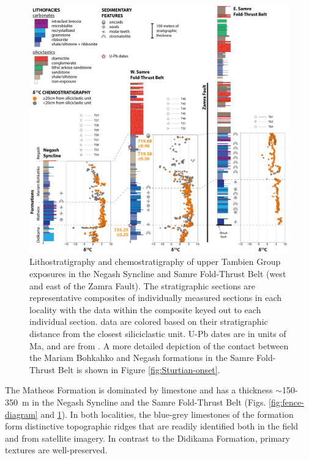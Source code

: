 \begin{figure}[h!]
\begin{center}
	\includegraphics[width=\textwidth]{figures/Tambien/upper-Tambien-comparison.pdf}
	\caption[Lithostratigraphy and \dC chemostratigraphy of the upper Tambien Group.]{Lithostratigraphy and \dC chemostratigraphy of upper Tambien Group exposures in the Negash Syncline and Samre Fold-Thrust Belt (west and east of the Zamra Fault). The stratigraphic sections are representative composites of individually measured sections in each locality with the data within the \dC composite keyed out to each individual section. \dC data are colored based on their stratigraphic distance from the closest siliciclastic unit. U-Pb dates are in units of Ma, and are from \citet{MacLennan2018a}. A more detailed depiction of the contact between the Mariam Bohkahko and Negash formations in the Samre Fold-Thrust Belt is shown in Figure \ref{fig:Sturtian-onset}.}
	\label{fig:upper-Tambien-comparison}
\end{center}
\end{figure}

The Matheos Formation is dominated by limestone and has a thickness $\sim$150-350~m in the Negash Syncline and the Samre Fold-Thrust Belt (Figs. \ref{fig:fence-diagram} and \ref{fig:upper-Tambien-comparison}). In both localities, the blue-grey limestones of the formation form distinctive topographic ridges that are readily identified both in the field and from satellite imagery. In contrast to the Didikama Formation, primary textures are well-preserved.

